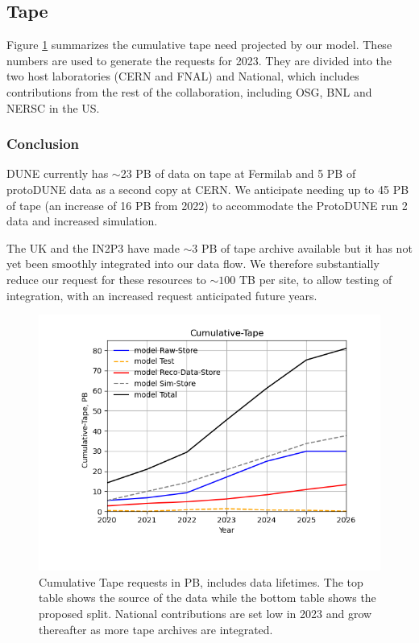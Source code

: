\documentclass[12pt]{article}
\begin{document}
\clearpage
\subsection{Tape}



Figure  \ref{fig:Cumulative-Tape}  summarizes the cumulative  tape need projected by our model. These numbers are used to generate the requests for 2023.  They are divided into the two host laboratories (CERN and FNAL) and National, which includes contributions from the rest of the collaboration, including OSG, BNL and NERSC in the US. 


\subsubsection{Conclusion}\label{sec:taperesult}
DUNE currently has $\sim$23 PB of data on tape at Fermilab and 5 PB of protoDUNE data as a second copy at CERN.  We anticipate needing up to 45 PB of tape (an increase of 16 PB from 2022) to accommodate the ProtoDUNE run 2 data and increased simulation. 

The UK and the IN2P3 have made $\sim 3$ PB of tape archive available but it has not yet been smoothly integrated into our data flow.  We  therefore substantially reduce our request for these resources to $\sim 100$ TB per site, to allow testing of integration, with an increased request anticipated future years. 

\begin{figure}[h]
\centering\includegraphics[height=0.4\textwidth]{MoreSim_2022-11-21-2026/MoreSim_2022-11-21-2026-Cumulative-Tape.png}

\caption{Cumulative Tape requests in PB, includes data lifetimes.  The top table shows the source of the data while the bottom table  shows the proposed split.  National contributions are set low in 2023 and grow thereafter as more tape archives are integrated. }\label{fig:Cumulative-Tape}
\end{figure}
\end{document}
